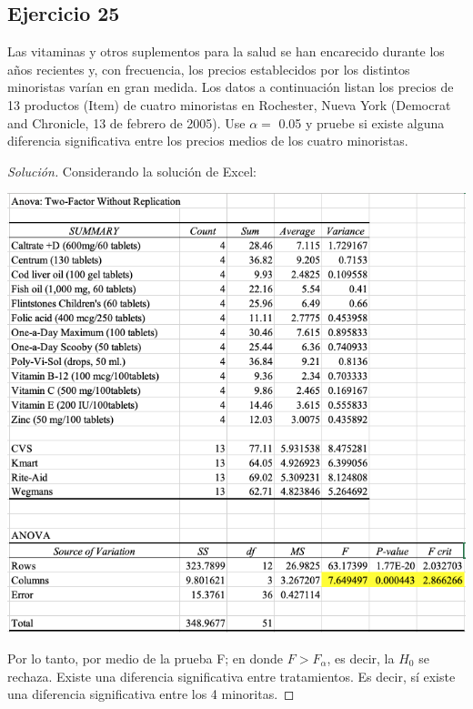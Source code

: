 \documentclass[a4paper,12pt]{article}
\newenvironment{solution}
  {\renewcommand\qedsymbol{$\blacksquare$}\begin{proof}[Solución]}
  {\end{proof}}
\begin{document}
\subsection{Ejercicio 25}
Las vitaminas y otros suplementos para la salud se han encarecido durante los años recientes y, con frecuencia, los precios establecidos por los distintos minoristas varían en gran medida. Los datos a continuación listan los precios de 13 productos (Item) de cuatro minoristas en Rochester, Nueva York (Democrat and Chronicle, 13 de febrero de 2005).
Use $\alpha=$ 0.05 y pruebe si existe alguna diferencia significativa entre los precios medios de los cuatro minoristas.
\begin{solution}
Considerando la solución de Excel: 
\begin{center}
    \includegraphics[scale=0.4]{Imagenes/25.png}
\end{center}
Por lo tanto, por medio de la prueba F; en donde $F>F_\alpha$, es decir, la $H_0$ se rechaza. Existe una diferencia significativa entre tratamientos. Es decir, sí existe una diferencia significativa entre los 4 minoritas. 
\end{solution}
\end{document}
